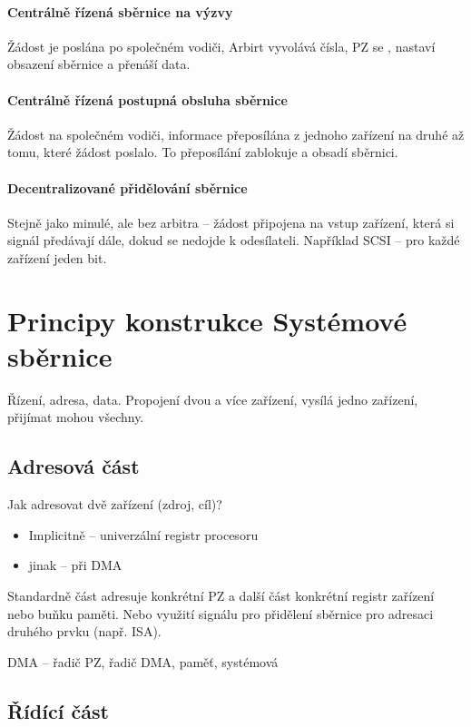 \documentclass[a4paper, 11pt]{report}
\begin{document}
\paragraph{Centrálně řízená sběrnice na výzvy}
Žádost je poslána po společném vodiči, Arbirt vyvolává čísla, PZ se , nastaví obsazení sběrnice a přenáší data.

\paragraph{Centrálně řízená postupná obsluha sběrnice}
Žádost na společném vodiči, informace  přeposílána  z jednoho zařízení na druhé až tomu, které žádost poslalo. To přeposílání zablokuje a obsadí sběrnici.

\paragraph{Decentralizované přidělování sběrnice}
Stejně jako minulé, ale bez arbitra -- žádost připojena na vstup zařízení, která si signál předávají dále, dokud se nedojde k odesílateli. Například SCSI -- pro každé zařízení jeden bit.

\section{Principy konstrukce Systémové sběrnice}

Řízení, adresa, data. Propojení dvou a více zařízení, vysílá jedno zařízení, přijímat mohou všechny. 

\subsection{Adresová část}
Jak adresovat dvě zařízení (zdroj, cíl)?
\begin{itemize}
	\item Implicitně -- univerzální registr procesoru
	\item jinak -- při DMA
\end{itemize}

Standardně část adresuje konkrétní PZ a další část konkrétní registr zařízení nebo buňku paměti. Nebo využití signálu pro přidělení sběrnice pro adresaci druhého prvku (např. ISA).

DMA -- řadič PZ, řadič DMA, paměť, systémová 

\subsection{Řídící část}
\end{document}
